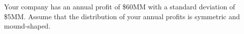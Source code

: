 \documentclass[11pt]{exam}
\begin{document}
\begin{questions}
%
%
%
%
%
%
%
%


\newpage


\question Your company has an annual profit of \$60MM with a standard
deviation of \$5MM.  Assume that the distribution of your annual profits is
symmetric and mound-shaped.

\end{questions}
\end{document}
